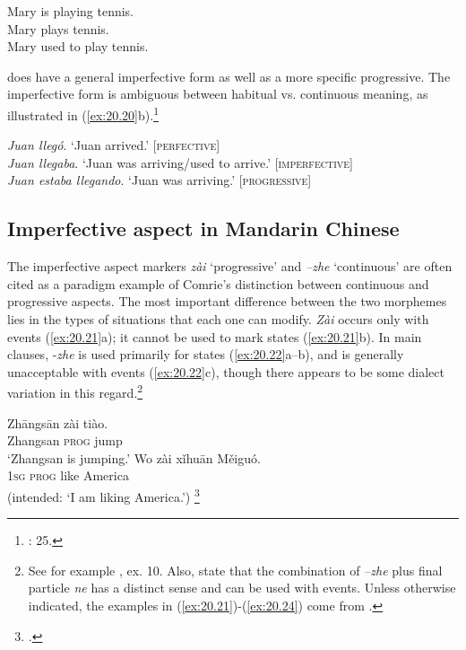 \ea \label{ex:20.19}
\ea  Mary is playing tennis.\\
\ex Mary plays tennis.\\
\ex Mary used to play tennis.
                       \z
\z


 does have a general imperfective form as well as a more specific progressive. The imperfective form is ambiguous between habitual vs. continuous meaning, as illustrated in (\ref{ex:20.20}b).\footnote{\citealt{Comrie1976}: 25.}


\ea \label{ex:20.20}
\ea  \textit{Juan llegó}.  ‘Juan arrived.’ \hfill  [\textsc{perfective}]\\
\ex \textit{Juan llegaba}.  ‘Juan was arriving/used to arrive.’ \hfill  [\textsc{imperfective}]\\
\ex \textit{Juan estaba llegando}.  ‘Juan was arriving.’ \hfill  [\textsc{progressive}]
                       \z
\z

\subsection{Imperfective aspect in Mandarin Chinese}\label{sec:20.4.2}

The  imperfective aspect markers \textit{zài} ‘progressive’ and \textit{–zhe} ‘continuous’ are often cited as a paradigm example of Comrie’s distinction between continuous and progressive aspects. The most important difference between the two morphemes lies in the types of situations that each one can modify. \textit{Zài} occurs only with events (\ref{ex:20.21}a); it cannot be used to mark states (\ref{ex:20.21}b). In main clauses, -\textit{zhe} is used primarily for states (\ref{ex:20.22}a--b), and is generally unacceptable with events (\ref{ex:20.22}c), though there appears to be some dialect variation in this regard.\footnote{See for example \citet[738]{KleinEtAl2000}, ex. 10. Also, \citet{LiThompson1981} state that the combination of \textit{–zhe} plus final particle \textit{ne} has a distinct sense and can be used with events. Unless otherwise indicated, the examples in (\ref{ex:20.21})-(\ref{ex:20.24}) come from \citet[220--222]{LiThompson1981}.}

\ea \label{ex:20.21}
\ea  \gll  Zhāngsān  zài  tiào.\\
Zhangsan  \textsc{prog}  jump\\
\glt ‘Zhangsan is jumping.’ 
\ex \gll  *Wo  zài  xǐhuān  Měiguó.\\
  \textsc{1sg}  \textsc{prog}  like  America\\
\glt (intended: ‘I am liking America.’)  \footnote{\citet[90]{Sun2011}.}
\z \z


